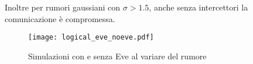 \documentclass[11 pt, a4paper]{article}
\begin{document}
Inoltre per rumori gaussiani con $\sigma>1.5$, anche senza intercettori la comunicazione è compromessa.

\begin{figure}[htb!]
\centering
\texttt{[image: logical\_eve\_noeve.pdf]}
\caption{Simulazioni con e senza Eve al variare del rumore}
\label{fig:locical_eve_noeve}
\end{figure}
\end{document}
